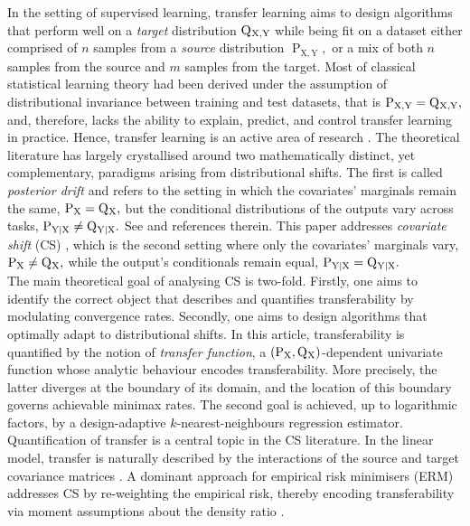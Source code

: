 \documentclass[10pt]{article}
\renewcommand{\P}{\operatorname{P}}
\newcommand{\Q}{\operatorname{Q}}
\newcommand{\X}{\operatorname{X}}
\newcommand{\Y}{\operatorname{Y}}
\newcommand{\sY}{\mathrm{Y}}
\newcommand{\sX}{\mathrm{X}}
\begin{document}
In the setting of supervised learning, transfer learning aims to design algorithms that perform well on a \textit{target} distribution $\Q\mathstrut_{\!\X, \sY}$ while being fit on a dataset either comprised of $n$ samples from a \textit{source} distribution $\P_{\sX, \sY},$ or a mix of both $n$ samples from the source and $m$ samples from the target. Most of classical statistical learning theory had been derived under the assumption of distributional invariance between training and test datasets, that is $\P_{\sX, \sY} = \Q\mathstrut_{\!\sX, \sY},$ and, therefore, lacks the ability to explain, predict, and control transfer learning in practice. Hence, transfer learning is an active area of research \cite{zhu2025}. The theoretical literature has largely crystallised around two mathematically distinct, yet complementary, paradigms arising from distributional shifts. The first is called \textit{posterior drift} and refers to the setting in which the covariates' marginals remain the same, $\P_{\sX} = \Q\mathstrut_{\!\sX},$ but the conditional distributions of the outputs vary across tasks, $\P_{\sY|\sX} \neq \Q\mathstrut_{\!\Y\!|\sX}.$ See \cite{auddy2025minimax, cai2024transfer} and references therein. This paper addresses \textit{covariate shift} (CS) \cite{shimodaira2000improving, sugiyama2007covariate}, which is the second setting where only the covariates' marginals vary, $\P_{\sX} \neq \Q\mathstrut_{\!\sX},$ while the output's conditionals remain equal, $\P_{\sY|\sX} = \Q\mathstrut_{\!\Y\!|\sX}.$ \\

The main theoretical goal of analysing CS is two-fold. Firstly, one aims to identify the correct object that describes and quantifies transferability by modulating convergence rates. Secondly, one aims to design algorithms that optimally adapt to distributional shifts. In this article, transferability is quantified by the notion of \textit{transfer function}, a $(\P_{\sX}, \Q\mathstrut_{\!\sX})$-dependent univariate function whose analytic behaviour encodes transferability. More precisely, the latter diverges at the boundary of its domain, and the location of this boundary governs achievable minimax rates. The second goal is achieved, up to logarithmic factors, by a design-adaptive $k$-nearest-neighbours regression estimator.\\

Quantification of transfer is a central topic in the CS literature. In the linear model, transfer is naturally described by the interactions of the source and target covariance matrices \cite{mallinar2024minimum, song2024generalization}. A dominant approach for empirical risk minimisers (ERM) addresses CS by re-weighting the empirical risk, thereby encoding transferability via moment assumptions about the density ratio \cite{ma2023optimally, gogolashvili2023importance, chen2024high, xu2025estimating, liu2025spectral, della2025computational, feng2024deep}.\\
\end{document}
